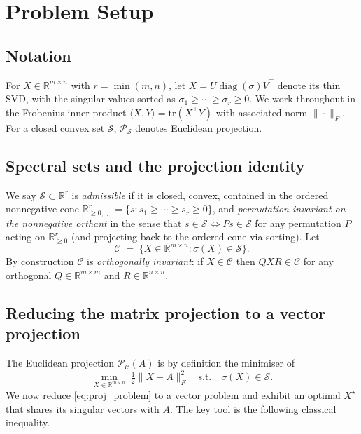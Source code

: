 \documentclass[journal]{IEEEtran}
\DeclareMathOperator{\diag}{diag}
\newcommand{\R}{\mathbb{R}}
\newcommand{\sgm}{\sigma}
\newcommand{\proj}{\mathcal{P}}
\newcommand{\spec}{\mathcal{S}}
\newcommand{\Cset}{\mathcal{C}}
\begin{document}
\section{Problem Setup}\label{sec:setup}

\subsection{Notation}
For $X \in \R^{m\times n}$ with $r = \min(m,n)$, let
$X = U \diag(\sgm) V^\top$ denote its thin SVD, with the singular
values sorted as
$\sgm_1 \ge \cdots \ge \sgm_r \ge 0$.
We work throughout in the Frobenius inner product
$\langle X, Y\rangle = \mathrm{tr}(X^\top Y)$
with associated norm $\|\cdot\|_F$.
For a closed convex set $\mathcal{S}$, $\proj_{\mathcal{S}}$ denotes
Euclidean projection.

\subsection{Spectral sets and the projection identity}
We say $\spec \subset \R^r$ is \emph{admissible} if it is closed, convex,
contained in the ordered nonnegative cone
$\R^r_{\ge 0,\downarrow} = \{s : s_1 \ge \cdots \ge s_r \ge 0\}$,
and \emph{permutation invariant on the nonnegative orthant} in the sense
that $s \in \spec \iff Ps \in \spec$ for any permutation $P$ acting on
$\R^r_{\ge 0}$ (and projecting back to the ordered cone via sorting).
Let
\begin{equation}\label{eq:Cset}
\Cset \;=\; \{ X \in \R^{m\times n} : \sgm(X) \in \spec \}.
\end{equation}
By construction $\Cset$ is \emph{orthogonally invariant}: if $X \in
\Cset$ then $QXR \in \Cset$ for any orthogonal $Q \in \R^{m\times m}$
and $R \in \R^{n\times n}$.

\subsection{Reducing the matrix projection to a vector projection}
\label{sec:proof}
The Euclidean projection $\proj_\Cset(A)$ is by definition the
minimiser of
\begin{equation}\label{eq:proj_problem}
\min_{X \in \R^{m\times n}} \; \tfrac{1}{2}\|X - A\|_F^2
\quad \text{s.t.}\quad \sgm(X) \in \spec.
\end{equation}
We now reduce \eqref{eq:proj_problem} to a vector problem and exhibit
an optimal $X^\star$ that shares its singular vectors with $A$. The
key tool is the following classical inequality.
\end{document}
